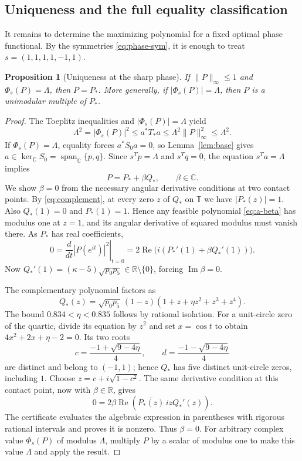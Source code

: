 \documentclass[11pt]{article}
\newtheorem{proposition}[theorem]{Proposition}
\newcommand{\T}{\mathbb T}
\newcommand{\C}{\mathbb C}
\newcommand{\R}{\mathbb R}
\DeclareMathOperator{\Rea}{Re}
\DeclareMathOperator{\Ima}{Im}
\begin{document}
\subsection{Uniqueness and the full equality classification}\label{sec:unique}

It remains to determine the maximizing polynomial for a fixed optimal phase functional. By the symmetries \eqref{eq:phase-sym}, it is enough to treat $s=(1,1,1,1,-1,1)$.

\begin{proposition}[Uniqueness at the sharp phase]\label{prop:unique}
If $\|P\|_\infty\le1$ and $\Phi_s(P)=\Lambda$, then $P=P_*$. More generally, if $|\Phi_s(P)|=\Lambda$, then $P$ is a unimodular multiple of $P_*$.
\end{proposition}
\begin{proof}
The Toeplitz inequalities and $|\Phi_s(P)|=\Lambda$ yield
\[
 \Lambda^2=|\Phi_s(P)|^2\le a^*T_*a\le\Lambda^2\|P\|_\infty^2\le\Lambda^2.
\]
If $\Phi_s(P)=\Lambda$, equality forces $a^*S_0a=0$, so Lemma~\ref{lem:base} gives $a\in\ker_\C S_0=\operatorname{span}_\C\{p,q\}$. Since $s^Tp=\Lambda$ and $s^Tq=0$, the equation $s^Ta=\Lambda$ implies
\begin{equation}\label{eq:a-beta}
 P=P_*+\beta Q_*,\qquad\beta\in\C.
\end{equation}
We show $\beta=0$ from the necessary angular derivative conditions at two contact points. By \eqref{eq:complement}, at every zero $z$ of $Q_*$ on $\T$ we have $|P_*(z)|=1$. Also $Q_*(1)=0$ and $P_*(1)=1$. Hence any feasible polynomial \eqref{eq:a-beta} has modulus one at $z=1$, and its angular derivative of squared modulus must vanish there. As $P_*$ has real coefficients,
\[
 0=\left.\frac{d}{dt}|P(e^{it})|^2\right|_{t=0}
 =2\Rea\bigl(i(P_*'(1)+\beta Q_*'(1))\bigr).
\]
Now $Q_*'(1)=(\kappa-5)\sqrt{p_0p_5}\in\R\setminus\{0\}$, forcing $\Ima\beta=0$.

The complementary polynomial factors as
\begin{equation}\label{eq:Qfactor}
 Q_*(z)=\sqrt{p_0p_5}\,(1-z)(1+z+\eta z^2+z^3+z^4).
\end{equation}
The bound $0.834<\eta<0.835$ follows by rational isolation. For a unit-circle zero of the quartic, divide its equation by $z^2$ and set $x=\cos t$ to obtain $4x^2+2x+\eta-2=0$. Its two roots
\begin{equation}\label{eq:cd}
 c=\frac{-1+\sqrt{9-4\eta}}4,\qquad
 d=\frac{-1-\sqrt{9-4\eta}}4
\end{equation}
are distinct and belong to $(-1,1)$; hence $Q_*$ has five distinct unit-circle zeros, including $1$. Choose $z=c+i\sqrt{1-c^2}$. The same derivative condition at this contact point, now with $\beta\in\R$, gives
\begin{equation}\label{eq:beta2}
 0=2\beta\Rea\left(\overline{P_*(z)}\,izQ_*'(z)\right).
\end{equation}
The certificate evaluates the algebraic expression in parentheses with rigorous rational intervals and proves it is nonzero. Thus $\beta=0$. For arbitrary complex value $\Phi_s(P)$ of modulus $\Lambda$, multiply $P$ by a scalar of modulus one to make this value $\Lambda$ and apply the result.
\end{proof}
\end{document}
